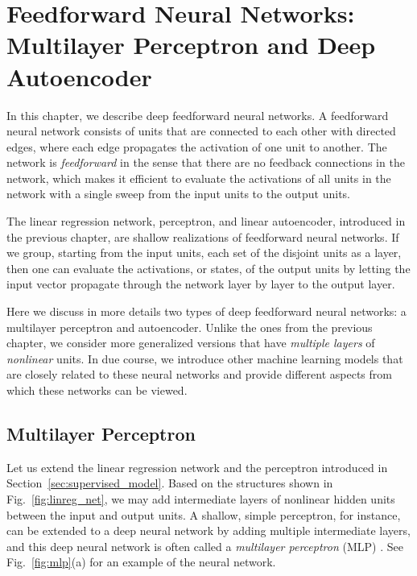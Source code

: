 \documentclass{now}
\begin{document}
\chapter{Feedforward Neural Networks: \\{\small Multilayer
Perceptron and Deep Autoencoder}}
\label{chap:ffnn}

In this chapter, we describe deep feedforward neural
networks. A feedforward neural network consists of units
that are connected to each other with directed edges, where
each edge propagates the activation of one unit to another.
The network is \textit{feedforward} in the sense that there
are no feedback connections in the network, which makes it
efficient to evaluate the activations of all units in the
network with a single sweep from the input units to the
output units.

The linear regression network, perceptron, and linear
autoencoder, introduced in the previous chapter, are shallow
realizations of feedforward neural networks.  If we group,
starting from the input units, each set of the disjoint
units as a layer, then one can evaluate the activations, or
states, of the output units by letting the input vector
propagate through the network layer by layer to the output
layer.

Here we discuss in more details two types of deep
feedforward neural networks: a multilayer
perceptron and autoencoder. Unlike the ones from the
previous chapter, we consider more generalized versions that
have \textit{multiple layers} of \textit{nonlinear} units.
In due course, we introduce other machine learning models
that are closely related to these neural networks and
provide different aspects from which these networks can be
viewed.

\section{Multilayer Perceptron}
\label{sec:mlp}

Let us extend the linear regression network and
the perceptron introduced in
Section~\ref{sec:supervised_model}.  Based on the structures
shown in Fig.~\ref{fig:linreg_net}, we may add intermediate
layers of nonlinear hidden units between the input and
output units. A shallow, simple perceptron, for instance,
can be extended to a deep neural network by adding multiple
intermediate layers, and this deep neural network is often
called a \textit{multilayer perceptron}
(MLP)
\citep{Rosenblatt1962}. See Fig.~\ref{fig:mlp}(a) for an
example of the neural network.
\end{document}
